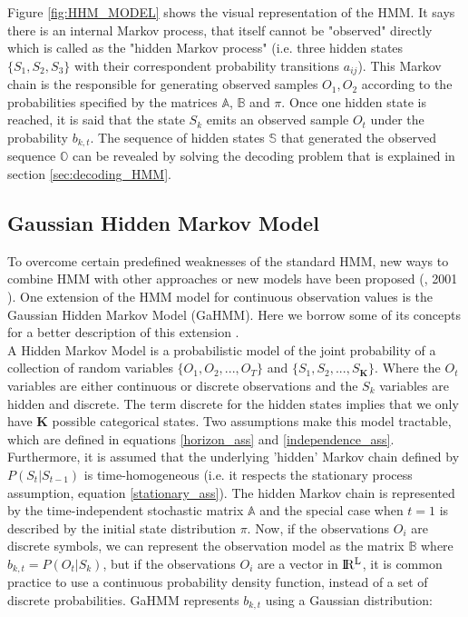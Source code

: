 Figure \ref{fig:HHM_MODEL} shows the visual representation of the HMM. It says there is an internal Markov process, that itself cannot be "observed" directly which is called as the "hidden Markov process" (i.e. three hidden states $\{S_1, S_2, S_3 \}$ with their correspondent probability transitions $a_{ij}$). This Markov chain is the responsible for generating observed samples ${O_1, O_2}$ according to the probabilities specified by the matrices $\mathbb{A}$, $\mathbb{B}$ and $\pi$. Once one hidden state is reached, it is said that the state $S_k$ emits an observed sample $O_t$ under the probability $b_{k,t}$. The sequence of hidden states $\mathbb{S}$ that generated the observed sequence $\mathbb{O}$ can be revealed by solving the decoding problem that is explained in section \ref{sec:decoding_HMM}. 




\subsection{Gaussian Hidden Markov Model}

To overcome certain predefined weaknesses of the standard HMM, new ways to combine HMM with other approaches or new models have been proposed (\citeauthor{ghahramani2001introduction}, 2001 \cite{ghahramani2001introduction}). One extension of the HMM model for continuous observation values is the Gaussian Hidden Markov Model (GaHMM). Here we borrow some of its concepts for a better description of this extension \cite{bilmes1998gentle,murphy2002dynamic}. \\

A Hidden Markov Model is a probabilistic model of the joint probability of a collection of random variables $\{ O_1,O_2, ...,O_T \}$ and $\{ S_1,S_2, ...,S_{\mathbf{K}} \}$. Where the $O_t$ variables are either continuous or discrete observations and the $S_k$ variables are hidden and discrete. The term discrete for the hidden states implies that we only have $\mathbf{K}$ possible categorical states. Two assumptions make this model tractable, which are defined in equations \ref{horizon_ass} and \ref{independence_ass}. Furthermore, it is assumed that the underlying 'hidden' Markov chain defined by $P(S_t |S_{t-1})$ is time-homogeneous (i.e. it respects the stationary process assumption, equation \ref{stationary_ass}). The hidden Markov chain is represented by the time-independent stochastic matrix $\mathbb{A}$ and the special case when $t=1$ is described by the initial state distribution $\pi$. Now, if the observations $O_i$ are discrete symbols, we can represent the observation model as the matrix $\mathbb{B}$ where $b_{k,t} = P(O_t|S_k)$, but if the observations $O_i$ are a vector in $\rm I\!R^{L}$, it is common practice to use a continuous probability density function, instead of a set of discrete probabilities. GaHMM represents $b_{k,t}$ using a Gaussian distribution: 

